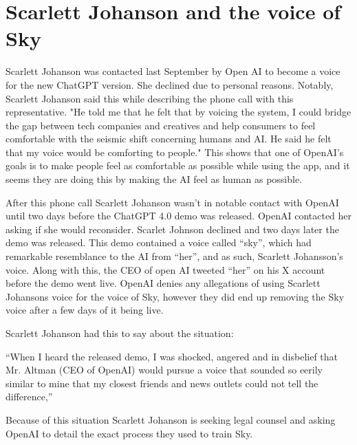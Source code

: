 \section{Scarlett Johanson and the voice of Sky}
\label{sec:ai}




  
Scarlett Johanson was contacted last September by Open AI to become a voice for the new ChatGPT version. She declined due to personal reasons. Notably, Scarlett Johanson said this while describing the phone call with this representative. "He told me that he felt that by voicing the system, I could bridge the gap between tech companies and creatives and help consumers to feel comfortable with the seismic shift concerning humans and AI. He said he felt that my voice would be comforting to people." This shows that one of OpenAI’s goals is to make people feel as comfortable as possible while using the app, and it seems they are doing this by making the AI feel as human as possible. 

After this phone call Scarlett Johanson wasn’t in notable contact with OpenAI until two days before the ChatGPT 4.0 demo was released. OpenAI contacted her asking if she would reconsider. Scarlet Johnson declined and two days later the demo was released. This demo contained a voice called “sky”, which had remarkable resemblance to the AI from “her”, and as such, Scarlett Johansson's voice. Along with this, the CEO of open AI tweeted “her” on his X account before the demo went live. OpenAI denies any allegations of using Scarlett Johansons voice for the voice of Sky, however they did end up removing the Sky voice after a few days of it being live. 

Scarlett Johanson had this to say about the situation: 

“When I heard the released demo, I was shocked, angered and in disbelief that Mr. Altman (CEO of OpenAI) would pursue a voice that sounded so eerily similar to mine that my closest friends and news outlets could not tell the difference,”

Because of this situation Scarlett Johanson is seeking legal counsel and asking OpenAI to detail the exact process they used to train Sky. 

